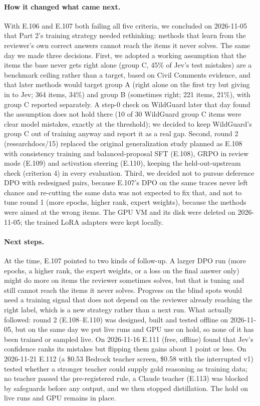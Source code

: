 \documentclass[11pt]{article}
\renewcommand{\_}{\origunderscore\allowbreak}
\begin{document}
\paragraph{How it changed what came next.}
With E.106 and E.107 both failing all five criteria, we concluded on 2026-11-05 that Part 2's training strategy needed rethinking: methods that learn from the reviewer's own correct answers cannot reach the items it never solves. The same day we made three decisions. First, we adopted a working assumption that the items the base never gets right alone (group C, 45\% of Jev's test mistakes) are a benchmark ceiling rather than a target, based on Civil Comments evidence, and that later methods would target group A (right alone on the first try but giving in to Jev; 364 items, 34\%) and group B (sometimes right; 221 items, 21\%), with group C reported separately. A step-0 check on WildGuard later that day found the assumption does not hold there (10 of 30 WildGuard group C items were clear model mistakes, exactly at the threshold); we decided to keep WildGuard's group C out of training anyway and report it as a real gap. Second, round 2 (research\_docs/15) replaced the original generalization study planned as E.108 with consistency training and balanced-proposal SFT (E.108), GRPO in review mode (E.109) and activation steering (E.110), keeping the held-out-upstream check (criterion 4) in every evaluation. Third, we decided not to pursue deference DPO with redesigned pairs, because E.107's DPO on the same traces never left chance and re-cutting the same data was not expected to fix that, and not to tune round 1 (more epochs, higher rank, expert weights), because the methods were aimed at the wrong items. The GPU VM and its disk were deleted on 2026-11-05; the trained LoRA adapters were kept locally.

\paragraph{Next steps.}
At the time, E.107 pointed to two kinds of follow-up. A larger DPO run (more epochs, a higher rank, the expert weights, or a loss on the final answer only) might do more on items the reviewer sometimes solves, but that is tuning and still cannot reach the items it never solves. Progress on the blind spots would need a training signal that does not depend on the reviewer already reaching the right label, which is a new strategy rather than a next run. What actually followed: round 2 (E.108--E.110) was designed, built and tested offline on 2026-11-05, but on the same day we put live runs and GPU use on hold, so none of it has been trained or sampled live. On 2026-11-16 E.111 (free, offline) found that Jev's confidence ranks its mistakes but flipping them gains about 1 point or less. On 2026-11-21 E.112 (a \$0.53 Bedrock teacher screen, \$0.58 with the interrupted v1) tested whether a stronger teacher could supply gold reasoning as training data; no teacher passed the pre-registered rule, a Claude teacher (E.113) was blocked by safeguards before any output, and we then stopped distillation. The hold on live runs and GPU remains in place.
\end{document}
